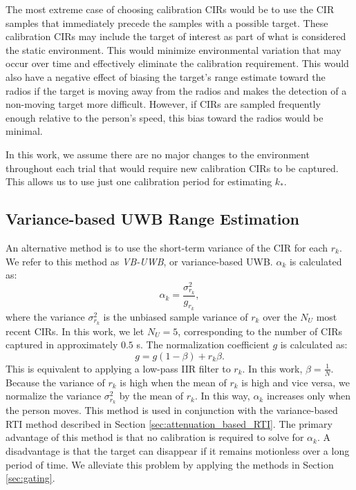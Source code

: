 \documentclass[conference]{IEEEtran}
\begin{document}
The most extreme case of choosing calibration CIRs would be to use the
CIR samples that immediately precede the samples with a possible
target. These calibration CIRs may include the target of interest as
part of what is considered the static environment. This would minimize
environmental variation that may occur over time and effectively
eliminate the calibration requirement. This would also have a negative
effect of biasing the target's range estimate toward the radios if the
target is moving away from the radios and makes the detection of a
non-moving target more difficult. However, if CIRs are sampled
frequently enough relative to the person's speed, this bias toward the
radios would be minimal.

In this work, we assume there are no major changes to the environment
throughout each trial that would require new calibration CIRs to be
captured. This allows us to use just one calibration period for
estimating $k_*$.



\subsection{Variance-based UWB Range Estimation} \label{sec:uwb_variance}
 
An alternative method is to use the short-term variance of the CIR for
each $r_k$. We refer to this method as \emph{VB-UWB}, or
variance-based UWB. $\alpha_k$ is calculated as:
\begin{equation}
\alpha_k = \frac{\sigma^2_{r_k}}{g_{r_k}},
\end{equation}
where the variance $\sigma^2_{r_k}$ is the unbiased sample variance of
$r_k$ over the $N_U$ most recent CIRs. In this work, we let $N_U=5$,
corresponding to the number of CIRs captured in approximately $0.5$
s. The normalization coefficient $g$ is calculated as:
\begin{equation}
g = g(1-\beta) + r_k\beta.
\end{equation}
This is equivalent to applying a low-pass IIR filter to $r_k$. In this
work, $\beta = \frac{1}{N}$. Because the variance of $r_k$ is high
when the mean of $r_k$ is high and vice versa, we normalize the
variance $\sigma^2_{r_k}$ by the mean of $r_k$. In this way,
$\alpha_k$ increases only when the person moves. This method is used
in conjunction with the variance-based RTI method described in Section
\ref{sec:attenuation_based_RTI}. The primary advantage of this method
is that no calibration is required to solve for $\alpha_k$. A
disadvantage is that the target can disappear if it remains motionless
over a long period of time. We alleviate this problem by applying the
methods in Section \ref{sec:gating}.
\end{document}
